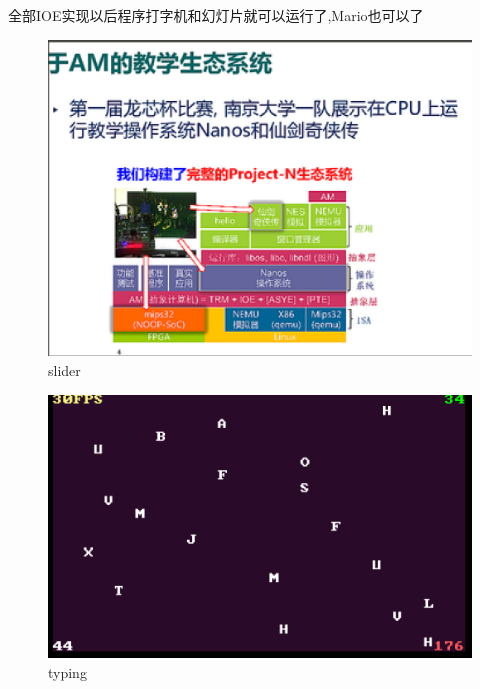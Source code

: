 \documentclass[UTF8,a4paper,10pt]{ctexart}
\begin{document}
{    全部IOE实现以后程序打字机和幻灯片就可以运行了,Mario也可以了
    \begin{figure}[H]
        \centering
        \includegraphics[scale=0.25]{fig/20.png}
        \caption{slider}
    \end{figure}
    \begin{figure}[H]
        \centering
        \includegraphics[scale=0.25]{fig/21.png}
        \caption{typing}
    \end{figure}
    \begin{figure}[H]
        \centering

\end{figure}}
\end{document}
